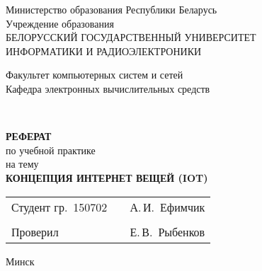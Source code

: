 \begin{titlepage}
    \begin{center}
      Министерство образования Республики Беларусь\\[1em]
      Учреждение образования\\
      БЕЛОРУССКИЙ ГОСУДАРСТВЕННЫЙ УНИВЕРСИТЕТ\\
      ИНФОРМАТИКИ И РАДИОЭЛЕКТРОНИКИ\\[2em]
  
      \begin{minipage}{\textwidth}
        \begin{flushleft}
          Факультет компьютерных систем и сетей\\[1em]
          Кафедра электронных вычислительных средств\\[1em]
        \end{flushleft}
      \end{minipage}\\[1em]
      
      \vfill

      {\bfseries РЕФЕРАТ}\\
      {по учебной практике}\\
      {на тему}\\[1em]
      \MakeUppercase{\bfseries Концепция Интернет вещей (IoT)}\\[1em]

      \vfill

      \begin{tabular}{p{}p{}p{}}
        Студент гр.~150702     &&   А.\,И.~Ефимчик     \\
                               &&                     \\
        Проверил               &&   Е.\,В.~Рыбенков   \\
      \end{tabular}
      
      \vfill

      {\normalsize Минск \the\year}
    \end{center}
\end{titlepage}